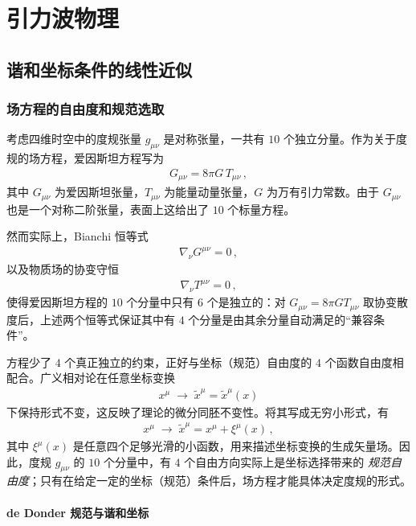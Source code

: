 \section{引力波物理}
\subsection{谐和坐标条件的线性近似}

\subsubsection{场方程的自由度和规范选取}

考虑四维时空中的度规张量 $g_{\mu\nu}$ 是对称张量，一共有 $10$ 个独立分量。作为关于度规的场方程，爱因斯坦方程写为
\begin{align}
G_{\mu\nu} = 8\pi G\,T_{\mu\nu}\,,
\end{align}
其中 $G_{\mu\nu}$ 为爱因斯坦张量，$T_{\mu\nu}$ 为能量动量张量，$G$ 为万有引力常数。由于 $G_{\mu\nu}$ 也是一个对称二阶张量，表面上这给出了 $10$ 个标量方程。

然而实际上，Bianchi 恒等式
\begin{align}
\nabla_{\nu}G^{\mu\nu} = 0\,,
\end{align}
以及物质场的协变守恒
\begin{align}
\nabla_{\nu}T^{\mu\nu} = 0\,,
\end{align}
使得爱因斯坦方程的 $10$ 个分量中只有 $6$ 个是独立的：对 $G_{\mu\nu}=8\pi G T_{\mu\nu}$ 取协变散度后，上述两个恒等式保证其中有 $4$ 个分量是由其余分量自动满足的“兼容条件”。

\noindent
方程少了 $4$ 个真正独立的约束，正好与坐标（规范）自由度的 $4$ 个函数自由度相配合。广义相对论在任意坐标变换
\begin{align}
x^{\mu} \;\longrightarrow\; \widetilde{x}^{\mu} = \widetilde{x}^{\mu}(x)
\end{align}
下保持形式不变，这反映了理论的微分同胚不变性。将其写成无穷小形式，有
\begin{align}
x^{\mu} \;\longrightarrow\; \widetilde{x}^{\mu} = x^{\mu} + \xi^{\mu}(x)\,,
\end{align}
其中 $\xi^{\mu}(x)$ 是任意四个足够光滑的小函数，用来描述坐标变换的生成矢量场。因此，度规 $g_{\mu\nu}$ 的 $10$ 个分量中，有 $4$ 个自由方向实际上是坐标选择带来的 \emph{规范自由度}；只有在给定一定的坐标（规范）条件后，场方程才能具体决定度规的形式。

\paragraph{de Donder 规范与谐和坐标}

